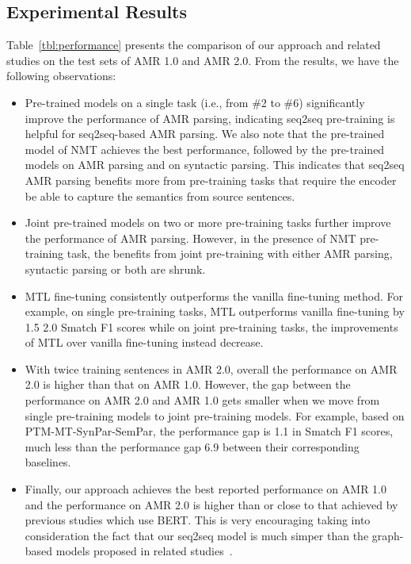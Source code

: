 \documentclass[11pt,a4paper]{article}
\begin{document}
\subsection{Experimental Results}
Table~\ref{tbl:performance} presents the comparison of our approach and related studies on the test sets of AMR 1.0 and AMR 2.0. From the results, we have the following observations:

\begin{itemize}\item Pre-trained models on a single task (i.e., from \#2 to \#6) significantly improve the performance of AMR parsing, indicating seq2seq pre-training is helpful for seq2seq-based AMR parsing. We also note that the pre-trained model of NMT achieves the best performance, followed by the pre-trained models on AMR parsing and on syntactic parsing. This indicates that seq2seq AMR parsing benefits more from pre-training tasks that require the encoder be able to capture the semantics from source sentences. 
    \item Joint pre-trained models on two or more pre-training tasks further improve the performance of AMR parsing. However, in the presence of NMT pre-training task, the benefits from joint pre-training with either AMR parsing, syntactic parsing or both are shrunk. 
    \item MTL fine-tuning consistently outperforms the vanilla fine-tuning method. For example, on single pre-training tasks, MTL outperforms vanilla fine-tuning by 1.5  2.0 Smatch F1 scores while on joint pre-training tasks, the improvements of MTL over vanilla fine-tuning instead decrease.
    \item With twice training sentences in AMR 2.0, overall the performance on AMR 2.0 is higher than that on AMR 1.0. However, the gap between the performance on AMR 2.0 and AMR 1.0 gets smaller when we move from single pre-training models to joint pre-training models. For example, based on PTM-MT-SynPar-SemPar, the performance gap is 1.1 in Smatch F1 scores, much less than the performance gap 6.9 between their corresponding baselines.
    \item Finally, our approach achieves the best reported performance on AMR 1.0 and the performance on AMR 2.0 is higher than or close to that achieved by previous studies which use BERT. This is very encouraging taking into consideration the fact that our seq2seq model is much simper than the graph-based models proposed in related studies~\cite{zhang_etal_acl_2019,zhang_etal_emnlp_2019,naseem_etal_acl_2019, cai_lam_acl_2020}.
\end{itemize}
\end{document}
